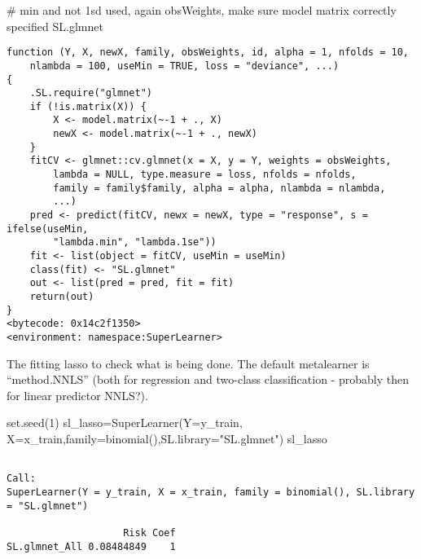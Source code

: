 \documentclass[
  letterpaper,
  DIV=11,
  numbers=noendperiod]{scrartcl}
\newenvironment{Shaded}{\begin{snugshade}}{\end{snugshade}}
\newcommand{\AttributeTok}[1]{\textcolor[rgb]{0.40,0.45,0.13}{#1}}
\newcommand{\CommentTok}[1]{\textcolor[rgb]{0.37,0.37,0.37}{#1}}
\newcommand{\DecValTok}[1]{\textcolor[rgb]{0.68,0.00,0.00}{#1}}
\newcommand{\FunctionTok}[1]{\textcolor[rgb]{0.28,0.35,0.67}{#1}}
\newcommand{\NormalTok}[1]{\textcolor[rgb]{0.00,0.23,0.31}{#1}}
\newcommand{\OtherTok}[1]{\textcolor[rgb]{0.00,0.23,0.31}{#1}}
\newcommand{\SpecialCharTok}[1]{\textcolor[rgb]{0.37,0.37,0.37}{#1}}
\newcommand{\StringTok}[1]{\textcolor[rgb]{0.13,0.47,0.30}{#1}}
\begin{document}
\begin{Shaded}
\begin{Highlighting}[]
\CommentTok{\# min and not 1sd used, again obsWeights, make sure model matrix correctly specified}
\NormalTok{SL.glmnet}
\end{Highlighting}
\end{Shaded}

\begin{verbatim}
function (Y, X, newX, family, obsWeights, id, alpha = 1, nfolds = 10, 
    nlambda = 100, useMin = TRUE, loss = "deviance", ...) 
{
    .SL.require("glmnet")
    if (!is.matrix(X)) {
        X <- model.matrix(~-1 + ., X)
        newX <- model.matrix(~-1 + ., newX)
    }
    fitCV <- glmnet::cv.glmnet(x = X, y = Y, weights = obsWeights, 
        lambda = NULL, type.measure = loss, nfolds = nfolds, 
        family = family$family, alpha = alpha, nlambda = nlambda, 
        ...)
    pred <- predict(fitCV, newx = newX, type = "response", s = ifelse(useMin, 
        "lambda.min", "lambda.1se"))
    fit <- list(object = fitCV, useMin = useMin)
    class(fit) <- "SL.glmnet"
    out <- list(pred = pred, fit = fit)
    return(out)
}
<bytecode: 0x14c2f1350>
<environment: namespace:SuperLearner>
\end{verbatim}

The fitting lasso to check what is being done. The default metalearner
is ``method.NNLS'' (both for regression and two-class classification -
probably then for linear predictor NNLS?).

\begin{Shaded}
\begin{Highlighting}[]
\FunctionTok{set.seed}\NormalTok{(}\DecValTok{1}\NormalTok{)}
\NormalTok{sl\_lasso}\OtherTok{=}\FunctionTok{SuperLearner}\NormalTok{(}\AttributeTok{Y=}\NormalTok{y\_train, }\AttributeTok{X=}\NormalTok{x\_train,}\AttributeTok{family=}\FunctionTok{binomial}\NormalTok{(),}\AttributeTok{SL.library=}\StringTok{"SL.glmnet"}\NormalTok{)}
\NormalTok{sl\_lasso}
\end{Highlighting}
\end{Shaded}

\begin{verbatim}

Call:  
SuperLearner(Y = y_train, X = x_train, family = binomial(), SL.library = "SL.glmnet") 

                    Risk Coef
SL.glmnet_All 0.08484849    1
\end{verbatim}

\begin{Shaded}
\end{Shaded}
\end{document}
